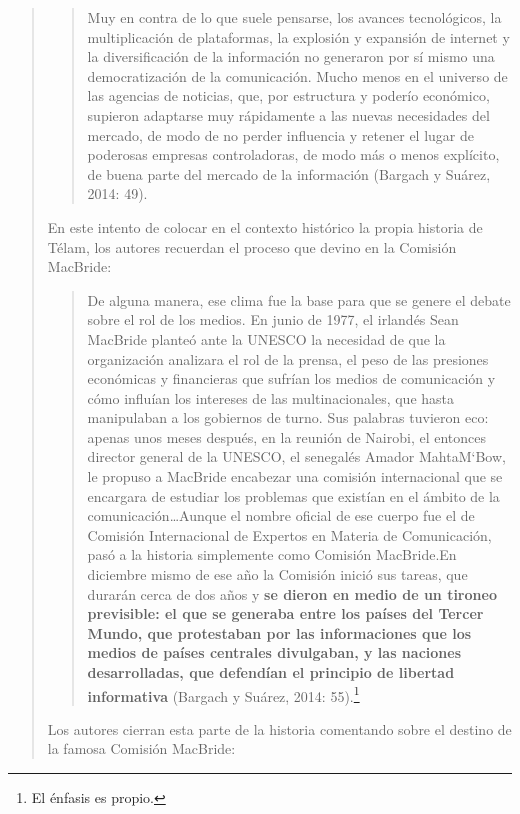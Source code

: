 \begin{quote}
\begin{quote}
	Muy en contra de lo que suele pensarse, los avances tecnológicos, la multiplicación de plataformas, la explosión y expansión de internet y la diversificación de la información no generaron por sí mismo una democratización de la comunicación. Mucho menos en el universo de las agencias de noticias, que, por estructura y poderío económico, supieron adaptarse muy rápidamente a las nuevas necesidades del mercado, de modo de no perder influencia y retener el lugar de poderosas empresas controladoras, de modo más o menos explícito, de buena parte del mercado de la información (Bargach y Suárez, 2014: 49).
\end{quote}


En este intento de colocar en el contexto histórico la propia historia de Télam, los autores recuerdan el proceso que devino en la Comisión MacBride:

\begin{quote}
	De alguna manera, ese clima fue la base para que se genere el debate sobre el rol de los medios. En junio de 1977, el irlandés Sean MacBride planteó ante la UNESCO la necesidad de que la organización analizara el rol de la prensa, el peso de las presiones económicas y financieras que sufrían los medios de comunicación y cómo influían los intereses de las multinacionales, que hasta manipulaban a los gobiernos de turno. Sus palabras tuvieron eco: apenas unos meses después, en la reunión de Nairobi, el entonces director general de la UNESCO, el senegalés Amador MahtaM`Bow, le propuso a MacBride encabezar una comisión internacional que se encargara de estudiar los problemas que existían en el ámbito de la comunicación\dots Aunque el nombre oficial de ese cuerpo fue el de Comisión Internacional de Expertos en Materia de Comunicación, pasó a la historia simplemente como Comisión MacBride.En diciembre mismo de ese año la Comisión inició sus tareas, que durarán cerca de dos años y \textbf{se dieron en medio de un tironeo previsible: el que se generaba entre los países del Tercer Mundo, que protestaban por las informaciones que los medios de países centrales divulgaban, y las naciones desarrolladas, que defendían el principio de libertad informativa} (Bargach y Suárez, 2014: 55).\footnote{El énfasis es propio.}
\end{quote}


Los autores cierran esta parte de la historia comentando sobre el destino de la famosa Comisión MacBride:


\end{quote}
